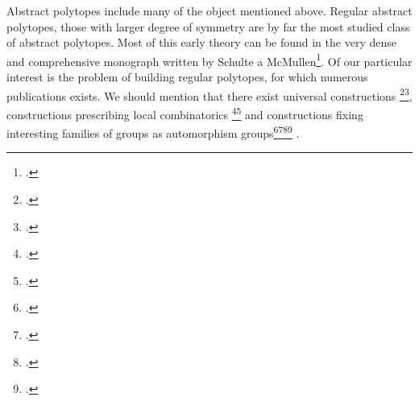 
Abstract polytopes include many of the object mentioned above.
Regular abstract polytopes, those with larger degree of symmetry are by far the most studied class of abstract polytopes.
Most of this early theory can be found in the very dense and comprehensive monograph written by Schulte a McMullen\footcite{McMullenSchulte_2002_AbstractRegularPolytopes}.
Of our particular interest is the problem of building regular polytopes, for which numerous publications exists.
We should mention that there exist universal constructions%
\footcite{Schulte_1983_ArrangingRegularIncidence}\footcite{Schulte_1985_ExtensionsRegularComplexes}, %
constructions prescribing local combinatorics \footcite{Danzer_1984_RegularIncidenceComplexes}\footcite{ Pellicer_2009_ExtensionsRegularPolytopes} %
and constructions fixing interesting families of groups as automorphism groups\footcite{CameronFernandesLeemansMixer_2017_HighestRankPolytope}\footcite{FernandesLeemans_2018_CGroupsHigh}\footcite{ LeemansMoerenhoutOReillyRegueiro_2017_ProjectiveLinearGroups}\footcite{ Pellicer_2008_CprGraphsRegular} .


